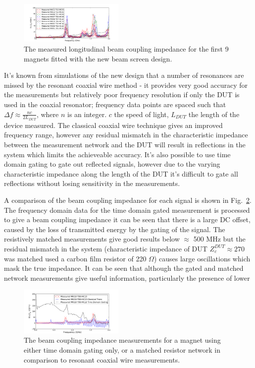 \documentclass[a4paper,
              ]{jacow}
\begin{document}
\begin{figure}
\includegraphics[width=0.45\textwidth]{mkiNewDesignAll.pdf}
\caption{The measured longitudinal beam coupling impedance for the first 9 magnets fitted with the new beam screen design.}
\label{fig:allNewMKIImp}
\end{figure}

It's known from simulations of the new design \cite{DayThesis} that a number of resonances are missed by the resonant coaxial wire method - it provides very good accuracy for the measurements but relatively poor frequency resolution if only the DUT is used in the coaxial resonator; frequency data points are spaced such that $\Delta f \approx \frac{nc}{2L_{DUT}}$, where $n$ is an integer. $c$ the speed of light, $L_{DUT}$ the length of the device measured. The classical coaxial wire technique gives an improved frequency range, however any residual mismatch in the characteristic impedance between the measurement network and the DUT will result in reflections in the system which limits the achieveable accuracy. It's also possible to use time domain gating to gate out reflected signals, however due to the varying characteristic impedance along the length of the DUT it's difficult to gate all reflections without losing sensitivity in the measurements.

A comparison of the beam coupling impedance for each signal is shown in Fig.~\ref{fig:measComp}. The frequency domain data for the time domain gated measurement is processed to give a beam coupling impedance it can be seen that there is a large DC offset, caused by the loss of transmitted energy by the gating of the signal. The resistively matched measurements give good results below $\approx$ 500 MHz but the residual mismatch in the system (characteristic impedance of DUT $Z_{c}^{DUT}\approx 270$ was matched used a carbon film resistor of 220 $\Omega$) causes large oscillations which mask the true impedance. It can be seen that although the gated and matched network measurements give useful information, particularly the presence of lower

\begin{figure}
\includegraphics[width=0.45\textwidth]{compMeasurementGating.pdf}
\caption{The beam coupling impedance measurements for a magnet using either time domain gating only, or a matched resistor network in comparison to resonant coaxial wire measurements.}
\label{fig:measComp}
\end{figure}
\end{document}
